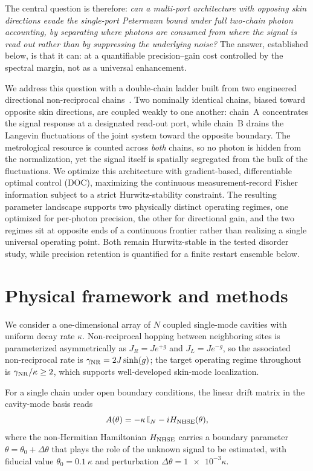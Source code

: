 \documentclass[aps,prxquantum,preprint,superscriptaddress,amsmath,amssymb]{revtex4-2}
\newcommand{\gNR}{\gamma_{\rm NR}}
\begin{document}
The central question is therefore: \emph{can a multi-port architecture with opposing skin directions evade the single-port Petermann bound under full two-chain photon accounting, by separating where photons are consumed from where the signal is read out rather than by suppressing the underlying noise?} The answer, established below, is that it can: at a quantifiable precision--gain cost controlled by the spectral margin, not as a universal enhancement.

We address this question with a double-chain ladder built from two engineered directional non-reciprocal chains~\citep{Metelmann2015,Fang2017,Peterson2017,Kongkui2024,Berinyuy2025}. Two nominally identical chains, biased toward opposite skin directions, are coupled weakly to one another: chain~A concentrates the signal response at a designated read-out port, while chain~B drains the Langevin fluctuations of the joint system toward the opposite boundary. The metrological resource is counted across \emph{both} chains, so no photon is hidden from the normalization, yet the signal itself is spatially segregated from the bulk of the fluctuations. We optimize this architecture with gradient-based, differentiable optimal control (DOC), maximizing the continuous measurement-record Fisher information subject to a strict Hurwitz-stability constraint. The resulting parameter landscape supports two physically distinct operating regimes, one optimized for per-photon precision, the other for directional gain, and the two regimes sit at opposite ends of a continuous frontier rather than realizing a single universal operating point. Both remain Hurwitz-stable in the tested disorder study, while precision retention is quantified for a finite restart ensemble below.

\section{Physical framework and methods}
\label{sec:methods}

We consider a one-dimensional array of $N$ coupled single-mode cavities with uniform decay rate $\kappa$. Non-reciprocal hopping between neighboring sites is parameterized asymmetrically as $J_R=Je^{+g}$ and $J_L=Je^{-g}$, so the associated non-reciprocal rate is $\gNR=2J\sinh(g)$; the target operating regime throughout is $\gNR/\kappa\ge\num{2}$, which supports well-developed skin-mode localization.

For a single chain under open boundary conditions, the linear drift matrix in the cavity-mode basis reads
\begin{equation}\label{eq:obc_drift}
A(\theta)=-\kappa\,\mathbb{I}_N-iH_{\rm NHSE}(\theta),
\end{equation}
where the non-Hermitian Hamiltonian $H_{\rm NHSE}$ carries a boundary parameter $\theta=\theta_0+\Delta\theta$ that plays the role of the unknown signal to be estimated, with fiducial value $\theta_0=\qty{0.1}{\kappa}$ and perturbation $\Delta\theta=\num{1e-3}\kappa$.
\end{document}
